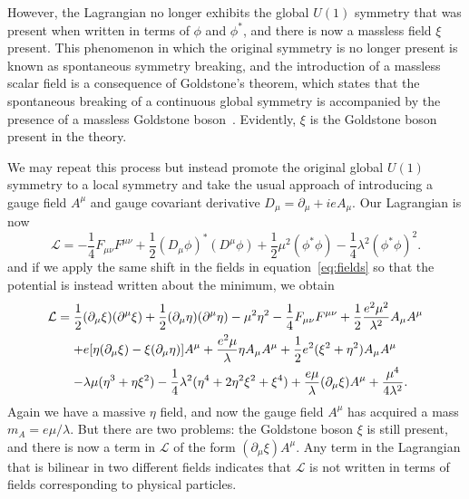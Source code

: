 
However, the Lagrangian no longer exhibits the global $U(1)$ symmetry that was present when written in terms of $\phi$ and $\phi^*$, and there is now a massless field $\xi$ present.
This phenomenon in which the original symmetry is no longer present is known as spontaneous symmetry breaking, and the introduction of a massless scalar field is a consequence of Goldstone's theorem, which states that the spontaneous breaking of a continuous global symmetry is accompanied by the presence of a massless Goldstone boson~\cite{PhysRev.127.965}.
Evidently, $\xi$ is the Goldstone boson present in the theory.

We may repeat this process but instead promote the original global $U(1)$ symmetry to a local symmetry and take the usual approach of introducing a gauge field $A^\mu$ and gauge covariant derivative $D_\mu=\partial_\mu+ieA_\mu$.
Our Lagrangian is now
\begin{equation}
  \mathcal{L}=-\frac{1}{4}F_{\mu\nu}F^{\mu\nu}+\frac{1}{2}(D_\mu\phi)^*(D^\mu\phi)+\frac{1}{2}\mu^2(\phi^*\phi)-\frac{1}{4}\lambda^2(\phi^*\phi)^2.
\end{equation}
and if we apply the same shift in the fields in equation~\ref{eq:fields} so that the potential is instead written about the minimum, we obtain
\begin{equation}
  \begin{aligned}
    \mathcal{L} &= \frac{1}{2}(\partial_\mu\xi)(\partial^\mu\xi)+\frac{1}{2}(\partial_\mu\eta)(\partial^\mu\eta)-\mu^2\eta^2-\frac{1}{4}F_{\mu\nu}F^{\mu\nu}+\frac{1}{2}\frac{e^2\mu^2}{\lambda^2}A_\mu A^\mu\\
    &\equad+ e[\eta(\partial_\mu\xi)-\xi(\partial_\mu\eta)]A^\mu+\frac{e^2\mu}{\lambda}\eta A_\mu A^\mu+\frac{1}{2}e^2(\xi^2+\eta^2)A_\mu A^\mu\\
    &\equad- \lambda\mu(\eta^3+\eta\xi^2)-\frac{1}{4}\lambda^2(\eta^4+2\eta^2\xi^2+\xi^4)+\frac{e\mu}{\lambda}(\partial_\mu\xi)A^\mu+\frac{\mu^4}{4\lambda^2}.
  \end{aligned}
\end{equation}
Again we have a massive $\eta$ field, and now the gauge field $A^\mu$ has acquired a mass $m_A=e\mu/\lambda$.
But there are two problems: the Goldstone boson $\xi$ is still present, and there is now a term in $\mathcal{L}$ of the form $(\partial_\mu\xi)A^\mu$.
Any term in the Lagrangian that is bilinear in two different fields indicates that $\mathcal{L}$ is not written in terms of fields corresponding to physical particles.

